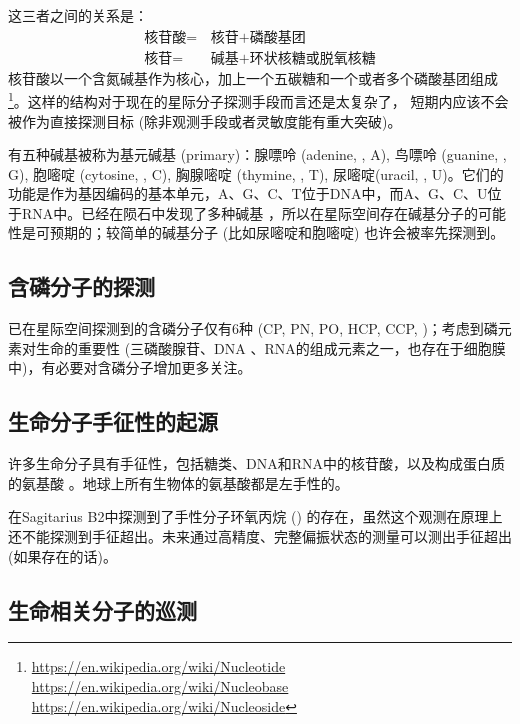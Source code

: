 \documentclass[a4paper]{article}
\newcommand\sgrb{Sagitarius B2}
\begin{document}
这三者之间的关系是：
\begin{equation}
\begin{split}
\text{核苷酸} =&\, \text{核苷} + \text{磷酸基团}\\
\text{核苷}   =&\, \text{碱基} + \text{环状核糖或脱氧核糖}
\end{split} 
\end{equation}
核苷酸以一个含氮碱基作为核心，加上一个五碳糖和一个或者多个磷酸基团组成\footnote{\url{https://en.wikipedia.org/wiki/Nucleotide} \url{https://en.wikipedia.org/wiki/Nucleobase} \url{https://en.wikipedia.org/wiki/Nucleoside}}。这样的结构对于现在的星际分子探测手段而言还是太复杂了，
短期内应该不会被作为直接探测目标 (除非观测手段或者灵敏度能有重大突破)。

有五种碱基被称为基元碱基 (primary)：腺嘌呤 (adenine, , A), 鸟嘌呤 (guanine, , G), 胞嘧啶 (cytosine, , C), 胸腺嘧啶 (thymine, , T), 尿嘧啶(uracil, , U)。它们的功能是作为基因编码的基本单元，A、G、C、T位于DNA中，而A、G、C、U位于RNA中。已经在陨石中发现了多种碱基 \citep{Callahan2011}，所以在星际空间存在碱基分子的可能性是可预期的；较简单的碱基分子 (比如尿嘧啶和胞嘧啶) 也许会被率先探测到。

\subsection{含磷分子的探测}

已在星际空间探测到的含磷分子仅有6种 (CP, PN, PO, HCP, CCP, )；考虑到磷元素对生命的重要性 (三磷酸腺苷、DNA
、RNA的组成元素之一，也存在于细胞膜中)，有必要对含磷分子增加更多关注。



\subsection{生命分子手征性的起源}

许多生命分子具有手征性，包括糖类、DNA和RNA中的核苷酸，以及构成蛋白质的氨基酸 \citep{McGuire2016}。地球上所有生物体的氨基酸都是左手性的。

\citet{McGuire2016a} 在\sgrb 中探测到了手性分子环氧丙烷 () 的存在，虽然这个观测在原理上还不能探测到手征超出。未来通过高精度、完整偏振状态的测量可以测出手征超出 (如果存在的话)。

\subsection{生命相关分子的巡测}
\end{document}
